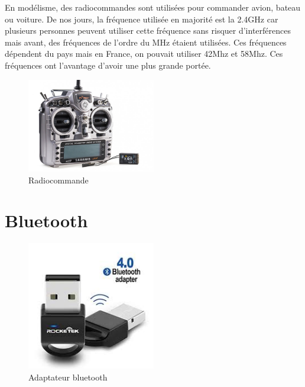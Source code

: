 \documentclass[a4paper, 11pt]{report}
\begin{document}
En modélisme, des radiocommandes sont utilisées pour commander avion, bateau ou voiture. De nos jours, la fréquence utilisée en majorité est la 2.4GHz car plusieurs personnes peuvent utiliser cette fréquence sans risquer d'interférences mais avant, des fréquences de l'ordre du MHz étaient utilisées. Ces fréquences dépendent du pays mais en France, on pouvait utiliser 42Mhz et 58Mhz. Ces fréquences ont l'avantage d'avoir une plus grande portée.

\begin{figure}[h!]
\begin{centering}
\includegraphics[width=0.5\textwidth]{images/taranis.jpg}
\caption{Radiocommande}
\par\end{centering}
\end{figure}

\section{Bluetooth}

\begin{figure}[h!]
\begin{centering}
\includegraphics[width=0.5\textwidth]{images/dongleBluetooth.jpeg}
\caption{Adaptateur bluetooth}
\par\end{centering}
\end{figure}
\end{document}
